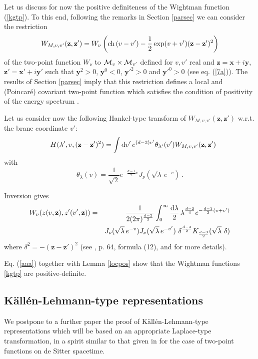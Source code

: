 \documentclass[a4paper,a4paper]{article}
\def\l{\lambda}
\newcommand{\xx}{{\mathbf{x}}}\newcommand{\yy}{{\mathbf{y}}}
\newcommand{\zz}{{\mathbf{z}}}
\def\ch{{\rm ch\,}}
\def\MM{{\cal M}}
\begin{document}
Let us discuss for now the positive definiteness of the Wightman
function (\ref{kgtp}). To this end, following the remarks in
Section \ref{parsec} we can consider the restriction
\begin{equation}
W_{M,v,v'}(\zz,\zz')  = W_\nu\left( \ch(v-v') - \frac 1 2
\exp(v+v')({\zz} -{\zz'})^2\right) \label{restriction}
\end{equation}
of the two-point function $W_\nu$ to $\MM_v\times \MM_{v'}$
defined for $v,v'$ real and $\zz = \xx + i \yy$, $\zz' = \xx' + i
\yy'$ such that $\yy^2 > 0$, $\yy^0 <0$, ${\yy'}^2 > 0$ and
${\yy'}^0>0$ (see eq. (\ref{7a})). The results of Section
\ref{parsec} imply that this restriction defines  a local and
(Poincar\'e) covariant two-point function which satisfies the
condition of positivity of the energy spectrum \cite{SW}.


%
Let us consider now the following Hankel-type transform of
$W_{M,v,v'}(\zz,\zz')$  w.r.t. the brane coordinate $v'$:
\begin{eqnarray} && H(\l',v,(\zz-\zz')^2)  = \int {\rm d}v'\, e^{(d-3)v'}  \theta_{\l'}(v')
W_{M,v,v'}(\zz,\zz') \label{htransform}
\end{eqnarray}
with \begin{equation} \theta_\l(v)=\frac 1 {\sqrt{2}} e^{-\frac
{d-1}2 v} J_\nu\left(\sqrt{\l} \, e^{-v }\right)\ .
\label{mode}\end{equation}

Inversion gives
\begin{eqnarray}
W_{\nu}(z( v,\zz),z'(v',\zz)) &=& \frac{1}{2(2\pi)^{\frac {d-2} 2}}
\int_0^\infty \frac{{\rm d}\lambda} 2 \, \lambda^{\frac {d-3} 4}
e^{-\frac {d-1} 2(v+v')}\nonumber\\
&& J_\nu(\sqrt{\lambda} \,e^{-v}) J_\nu
(\sqrt{\lambda}\,e^{-v'}) \ \delta^\frac{d-3}{2} K_{\frac {d-3}2}
(\sqrt{\lambda }\ \delta) \label{aaa}
\label{MAdS22}\end{eqnarray}
where $\delta^2 = - (\zz - \zz')^2$ (see \cite{B2}, p. 64, formula
(12), and \cite{BBGMS}
 for more details).

\vskip 0.2cm
Eq. (\ref{aaa}) together with Lemma \ref{locpos} show that the
Wightman functions \ref{kgtp} are positive-definite.

\subsection{K\"all\'en-Lehmann-type representations}
We postpone to a further paper the proof of
K\"all\'en-Lehmann-type representations which will be based
on an appropriate Laplace-type transformation, in a
spirit similar to that given in \cite{BM} for the case
of two-point functions on de Sitter spacetime.
\end{document}
